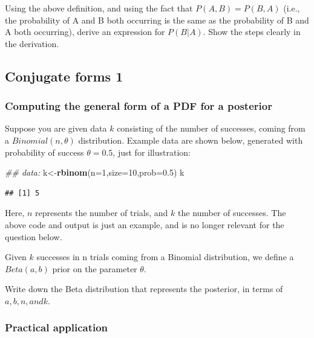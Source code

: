 \documentclass[12pt,]{krantz}
\newenvironment{Shaded}{\begin{snugshade}}{\end{snugshade}}
\newcommand{\CommentTok}[1]{\textcolor[rgb]{0.56,0.35,0.01}{\textit{#1}}}
\newcommand{\DataTypeTok}[1]{\textcolor[rgb]{0.13,0.29,0.53}{#1}}
\newcommand{\DecValTok}[1]{\textcolor[rgb]{0.00,0.00,0.81}{#1}}
\newcommand{\FloatTok}[1]{\textcolor[rgb]{0.00,0.00,0.81}{#1}}
\newcommand{\KeywordTok}[1]{\textcolor[rgb]{0.13,0.29,0.53}{\textbf{#1}}}
\newcommand{\NormalTok}[1]{#1}
\theoremstyle{definition}
\theoremstyle{definition}
\theoremstyle{definition}
\theoremstyle{remark}
\begin{document}
Using the above definition, and using the fact that \(P(A,B)=P(B,A)\) (i.e., the probability of A and B both occurring is the same as the probability of B and A both occurring),
derive an expression for \(P(B|A)\). Show the steps clearly in the derivation.

\hypertarget{conjugate-forms-1}{%
\subsection{Conjugate forms 1}\label{conjugate-forms-1}}

\hypertarget{computing-the-general-form-of-a-pdf-for-a-posterior}{%
\subsubsection{Computing the general form of a PDF for a posterior}\label{computing-the-general-form-of-a-pdf-for-a-posterior}}

Suppose you are given data \(k\) consisting of the number of successes, coming from a \(Binomial(n,\theta)\) distribution. Example data are shown below, generated with probability of success \(\theta=0.5\), just for illustration:

\begin{Shaded}
\begin{Highlighting}[]
\CommentTok{## data:}
\NormalTok{k<-}\KeywordTok{rbinom}\NormalTok{(}\DataTypeTok{n=}\DecValTok{1}\NormalTok{,}\DataTypeTok{size=}\DecValTok{10}\NormalTok{,}\DataTypeTok{prob=}\FloatTok{0.5}\NormalTok{)}
\NormalTok{k}
\end{Highlighting}
\end{Shaded}

\begin{verbatim}
## [1] 5
\end{verbatim}

Here, \(n\) represents the number of trials, and \(k\) the number of successes. The above code and output is just an example, and is no longer relevant for the question below.

Given \(k\) successes in n trials coming from a Binomial distribution, we define a \(Beta(a,b)\) prior on the parameter \(\theta\).

Write down the Beta distribution that represents the posterior, in terms of \(a,b, n, and k\).

\hypertarget{practical-application}{%
\subsubsection{Practical application}\label{practical-application}}
\end{document}
